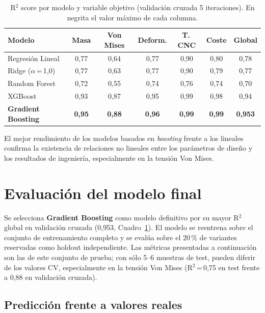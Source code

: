 \documentclass[11pt, a4paper]{article}
\begin{document}
\begin{table}[H]
\centering
\caption{R$^2$ score por modelo y variable objetivo (validación cruzada 5 iteraciones).
  En negrita el valor máximo de cada columna.}
\label{tab:benchmark}
\begin{tabular}{@{} l ccccc c @{}}
  \toprule
  \textbf{Modelo}
    & \textbf{Masa} & \textbf{Von Mises} & \textbf{Deform.}
    & \textbf{T.\,CNC} & \textbf{Coste}
    & \textbf{Global} \\
  \midrule
  Regresión Lineal           & 0{,}77 & 0{,}64 & 0{,}77 & 0{,}90 & 0{,}80 & 0{,}78\\
  Ridge ($\alpha$\,=\,1{,}0) & 0{,}77 & 0{,}63 & 0{,}77 & 0{,}90 & 0{,}79 & 0{,}77\\
  Random Forest              & 0{,}72 & 0{,}55 & 0{,}74 & 0{,}76 & 0{,}74 & 0{,}70\\
  XGBoost                    & 0{,}93 & 0{,}87 & 0{,}95 & 0{,}99 & 0{,}98 & 0{,}94\\
  \textbf{Gradient Boosting} & \textbf{0{,}95} & \textbf{0{,}88}
    & \textbf{0{,}96} & \textbf{0{,}99} & \textbf{0{,}99} & \textbf{0{,}953}\\
  \bottomrule
\end{tabular}
\end{table}

El mejor rendimiento de los modelos basados en \textit{boosting} frente a los lineales
confirma la existencia de relaciones no lineales entre los parámetros de diseño y los
resultados de ingeniería, especialmente en la tensión Von Mises.


\section{Evaluación del modelo final}

Se selecciona \textbf{Gradient Boosting} como modelo definitivo por su mayor R$^{2}$
global en validación cruzada (0{,}953, Cuadro~\ref{tab:benchmark}). El modelo se
reentrena sobre el conjunto de entrenamiento completo y se evalúa sobre el 20\,\% de
variantes reservadas como holdout independiente. Las métricas presentadas a continuación
son las de este conjunto de prueba; con sólo 5--6 muestras de test, pueden diferir
de los valores CV, especialmente en la tensión Von Mises (R$^{2}$\,=\,0{,}75 en test
frente a 0{,}88 en validación cruzada).

\subsection{Predicción frente a valores reales}
\end{document}
